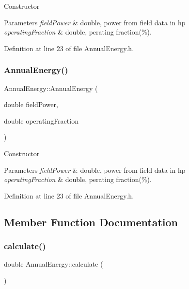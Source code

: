 Constructor 
\begin{DoxyParams}{Parameters}
{\em field\+Power} & double, power from field data in hp \\
\hline
{\em operating\+Fraction} & double, perating fraction(\%). \\
\hline
\end{DoxyParams}


Definition at line 23 of file Annual\+Energy.\+h.

\mbox{\label{class_annual_energy_a5e446ce85879bafeac8fc992cb5b9ed7}} 
\subsubsection{\texorpdfstring{Annual\+Energy()}{AnnualEnergy()}\hspace{0.1cm}{\footnotesize\ttfamily [3/3]}}
{\footnotesize\ttfamily Annual\+Energy\+::\+Annual\+Energy (\begin{DoxyParamCaption}\item[{double}]{field\+Power,  }\item[{double}]{operating\+Fraction }\end{DoxyParamCaption})\hspace{0.3cm}{\ttfamily [inline]}}

Constructor 
\begin{DoxyParams}{Parameters}
{\em field\+Power} & double, power from field data in hp \\
\hline
{\em operating\+Fraction} & double, perating fraction(\%). \\
\hline
\end{DoxyParams}


Definition at line 23 of file Annual\+Energy.\+h.



\subsection{Member Function Documentation}
\mbox{\label{class_annual_energy_ab599860ffb32ce20a1042a3e9d2ad57f}} 
\subsubsection{\texorpdfstring{calculate()}{calculate()}\hspace{0.1cm}{\footnotesize\ttfamily [1/3]}}
{\footnotesize\ttfamily double Annual\+Energy\+::calculate (\begin{DoxyParamCaption}{ }\end{DoxyParamCaption})}



